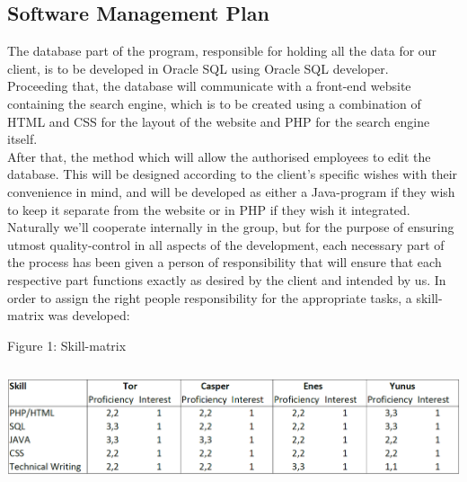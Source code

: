 \documentclass[12pt,a4paper]{article}
\begin{document}
\subsection{Software Management Plan}
The database part of the program, responsible for holding all the data for our client, is to be developed in Oracle SQL using Oracle SQL developer.\\
Proceeding that, the database will communicate with a front-end website containing the search engine, which is to be created using a combination of HTML and CSS for the layout of the website and PHP for the search engine itself.\\
After that, the method which will allow the authorised employees to edit the database. This will be designed according to the client’s specific wishes with their convenience in mind, and will be developed as either a Java-program if they wish to keep it separate from the website or in PHP if they wish it integrated.\\
Naturally we’ll cooperate internally in the group, but for the purpose of ensuring utmost quality-control in all aspects of the development, each necessary part of the process has been given a person of responsibility that will ensure that each respective part functions exactly as desired by the client and intended by us.
In order to assign the right people responsibility for the appropriate tasks, a skill-matrix was developed:\\

\begin{center}
Figure 1: Skill-matrix
\end{center}

\includegraphics[height=35mm]{Skillmatrix.png}\\
\end{document}
